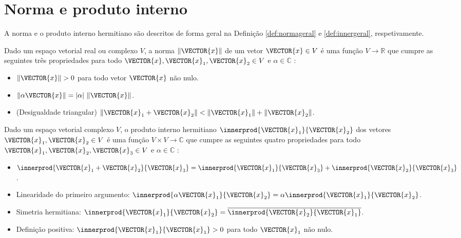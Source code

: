
\newpage
\section{Norma e produto interno}

A norma e o produto interno hermitiano são descritos de forma geral
na Definição \ref{def:normageral} e \ref{def:innergeral}, respetivamente.

\begin{definition}
\label{def:normageral}
Dado um espaço vetorial real ou complexo $V$,
a norma $\|\VECTOR{x}\|$ de um vetor $\VECTOR{x} \in V$ 
é uma função $V \rightarrow  \mathbb{R}$ 
que cumpre as seguintes três propriedades 
para todo $\VECTOR{x},\VECTOR{x}_1,\VECTOR{x}_2 \in V$ e $\alpha \in \mathbb{C}$ 
\cite[pp. 43]{d2019hermitian} \cite[pp. 27]{vetterli2014foundations}:
\begin{itemize}
\item $\|\VECTOR{x}\|> 0$ para todo vetor $\VECTOR{x}$ não nulo.
\item $\|\alpha \VECTOR{x}\|= |\alpha|~\|\VECTOR{x}\|$.
\item (Desigualdade triangular)  $\|\VECTOR{x}_1 + \VECTOR{x}_2\|< \|\VECTOR{x}_1\| + \|\VECTOR{x}_2\|$.
\end{itemize}
\end{definition}

\label{def:innergeral}
\begin{definition}
Dado um espaço vetorial complexo $V$, 
o produto interno hermitiano $\innerprod{\VECTOR{x}_1}{\VECTOR{x}_2} $ dos vetores $\VECTOR{x}_1,\VECTOR{x}_2 \in V$ 
é uma função $V\times V \rightarrow \mathbb{C}$ 
que cumpre as seguintes quatro propriedades para todo 
$\VECTOR{x}_1,\VECTOR{x}_2,\VECTOR{x}_3 \in V$ e $\alpha \in \mathbb{C}$
 \cite[pp. 44]{d2019hermitian} \cite[pp. 242]{damiano2011course}:
\begin{itemize}
\item $\innerprod{\VECTOR{x}_1+\VECTOR{x}_2}{\VECTOR{x}_3} = \innerprod{\VECTOR{x}_1}{\VECTOR{x}_3} + \innerprod{\VECTOR{x}_2}{\VECTOR{x}_3}$.
\item Linearidade do primeiro argumento: $\innerprod{\alpha \VECTOR{x}_1}{\VECTOR{x}_2} =\alpha \innerprod{\VECTOR{x}_1}{\VECTOR{x}_2}$.
\item Simetria hermitiana: $\innerprod{\VECTOR{x}_1}{\VECTOR{x}_2} =\overline{ \innerprod{\VECTOR{x}_2}{\VECTOR{x}_1}}$.
\item Definição positiva: $\innerprod{\VECTOR{x}_1}{\VECTOR{x}_1} > 0 $  para todo $\VECTOR{x}_1$ não nulo.
\end{itemize}
\end{definition}

